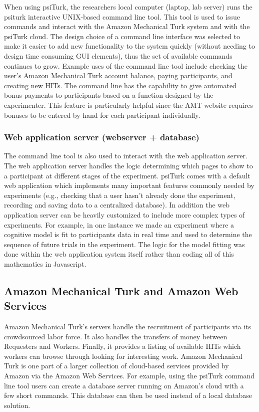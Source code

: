 \documentclass[twocolumn]{svjour3}          %
\begin{document}
When using \textsf{psiTurk}, the researchers 
local computer (laptop, lab server) runs the \textsf{psiturk} 
interactive UNIX-based command line tool.  
This tool is used to issue commands and interact
with the Amazon Mechanical Turk system and with the \textsf{psiTurk} cloud.  
The design choice of a command line interface was 
selected to make it easier to add new functionality to the system quickly (without 
needing to design time consuming GUI elements), thus the set of
available commands continues to grow.
Example uses of the command line tool include checking the user's Amazon
Mechanical Turk account balance, paying participants, and creating new HITs.
The command line has the capability to give automated bonus payments to 
participants based on a function designed by the experimenter. This feature is 
particularly helpful since the AMT website requires bonuses to be entered by hand 
for each participant individually.


\subsubsection{Web application server (webserver + database)}

The command line tool is also used to interact with the web application server.
The web application server handles the logic determining which pages to show
to a participant at different stages of the experiment.  \textsf{psiTurk} comes with
a default web application which implements many important features commonly
needed by experiments (e.g., checking that a user hasn't already done the experiment,
recording and saving data to a centralized database).  In addition the web application
server can be heavily customized to include more complex types of experiments.
For example, in one instance we made an experiment where a cognitive model
is fit to participants data in real time and used to determine the sequence of future
trials in the experiment.  The logic for the model fitting was done within the 
web application system itself rather than coding all of this mathematics in
Javascript.

\subsection{Amazon Mechanical Turk and Amazon Web Services}

 Amazon Mechanical Turk's servers handle the recruitment of participants via
its crowdsourced labor force.  It also handles the transfers of money between Requesters and
Workers.  Finally, it provides a listing of available HITs which workers can browse through looking
for interesting work.  Amazon Mechanical Turk is one part of a larger collection
of cloud-based services provided by Amazon via the Amazon Web Services.
For example, using the \textsf{psiTurk} command line tool users can create a
database server running on Amazon's cloud with a few short commands.  This database
can then be used instead of a local database solution.
\end{document}
